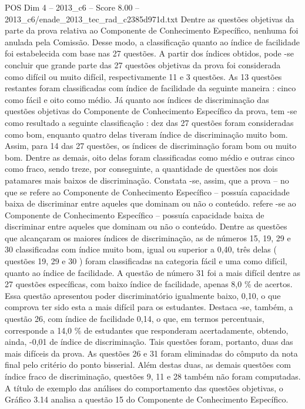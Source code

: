 \begin{textsample}{POS Dim 4 – 2013\_c6 – Score 8.00 – 2013\_c6/enade\_2013\_tec\_rad\_c2385d971d.txt}
Dentre as questões objetivas da parte da prova relativa ao Componente de Conhecimento Específico, nenhuma foi anulada pela Comissão.
Desse modo, a classificação quanto ao índice de facilidade foi estabelecida com base nas 27 questões.
A partir dos índices obtidos, pode -se concluir que grande parte das 27 questões objetivas da prova foi considerada como difícil ou muito difícil, respectivamente 11 e 3 questões.
As 13 questões restantes foram classificadas com índice de facilidade da seguinte maneira : cinco como fácil e oito como médio.
Já quanto aos índices de discriminação das questões objetivas do Componente de Conhecimento Específico da prova, tem -se como resultado a seguinte classificação : dez das 27 questões foram consideradas como bom, enquanto quatro delas tiveram índice de discriminação muito bom.
Assim, para 14 das 27 questões, os índices de discriminação foram bom ou muito bom.
Dentre as demais, oito delas foram classificadas como médio e outras cinco como fraco, sendo treze, por conseguinte, a quantidade de questões nos dois patamares mais baixos de discriminação.
Constata -se, assim, que a prova – no que se refere ao Componente de Conhecimento Específico – possuía capacidade baixa de discriminar entre aqueles que dominam ou não o conteúdo. refere -se ao Componente de Conhecimento Específico – possuía capacidade baixa de discriminar entre aqueles que dominam ou não o conteúdo.
Dentre as questões que alcançaram os maiores índices de discriminação, as de números 15, 19, 29 e 30 classificadas com índice muito bom, igual ou superior a 0,40, três delas ( questões 19, 29 e 30 ) foram classificadas na categoria fácil e uma como difícil, quanto ao índice de facilidade.
A questão de número 31 foi a mais difícil dentre as 27 questões específicas, com baixo índice de facilidade, apenas 8,0 \% de acertos.
Essa questão apresentou poder discriminatório igualmente baixo, 0,10, o que comprova ter sido esta a mais difícil para os estudantes.
Destaca -se, também, a questão 26, com índice de facilidade 0,14, o que, em termos percentuais, corresponde a 14,0 \% de estudantes que responderam acertadamente, obtendo, ainda, -0,01 de índice de discriminação.
Tais questões foram, portanto, duas das mais difíceis da prova.
As questões 26 e 31 foram eliminadas do cômputo da nota final pelo critério do ponto bisserial.
Além destas duas, as demais questões com índice fraco de discriminação, questões 9, 11 e 28 também não foram computadas.
A título de exemplo das análises do comportamento das questões objetivas, o Gráfico 3.14 analisa a questão 15 do Componente de Conhecimento Específico.

\end{textsample}
